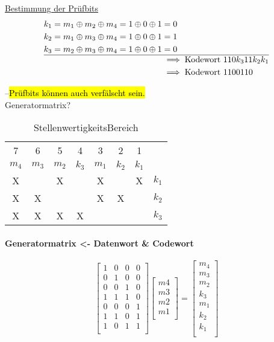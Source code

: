 \documentclass[a4paper]{scrartcl}
\begin{document}
					\ul{Bestimmung der Prüfbits}\\
					\begin{align*}
						k_1 = m_1 \oplus m_2 \oplus m_4 = 1 \oplus 0 \oplus 1 &= 0\\
						k_2 = m_1 \oplus m_3 \oplus m_4 = 1 \oplus 0 \oplus 1 &= 1\\
						k_3 = m_2 \oplus m_3 \oplus m_4 = 1 \oplus 0 \oplus 1 &= 0\\ \hline
						&\implies \text{Kodewort } 110 k_3 11 k_2 k_1\\
						&\implies \text{Kodewort } 1100110\\
					\end{align*}
					
					--\hl{Prüfbits können auch verfälscht sein.} \\
					
					Generatormatrix? \\
					\begin{table}
						\centering
						\begin{tabular}{| c | c | c | c | c | c | c | c |}
							\hline
							7&6&5&4&3&2&1\\
							\(m_4\)&\(m_3\)&\(m_2\)&\(k_3\)&\(m_1\)&\(k_2\)&\(k_1\)\\ \hline
							X&&X&&X&&X&\(k_1\)\\
							X&X&&&X&X&&\(k_2\)\\
							X&X&X&X&&&&\(k_3\)\\ \hline
						\end{tabular}
						\caption{StellenwertigkeitsBereich}
					\end{table}
					\paragraph{Generatormatrix <- Datenwort \& Codewort}
					\[
						\begin{bmatrix}
							1&0&0&0\\
							0&1&0&0\\
							0&0&1&0\\
							1&1&1&0\\
							0&0&0&1\\
							1&1&0&1\\
							1&0&1&1\\
						\end{bmatrix}
						\begin{bmatrix}
							m4\\
							m3\\
							m2\\
							m1\\
						\end{bmatrix}
						=
						\begin{bmatrix}
							m_4\\
							m_3\\
							m_2\\
							k_3\\
							m_1\\
							k_2\\
							k_1\\
						\end{bmatrix}
					\]
					
\end{document}

